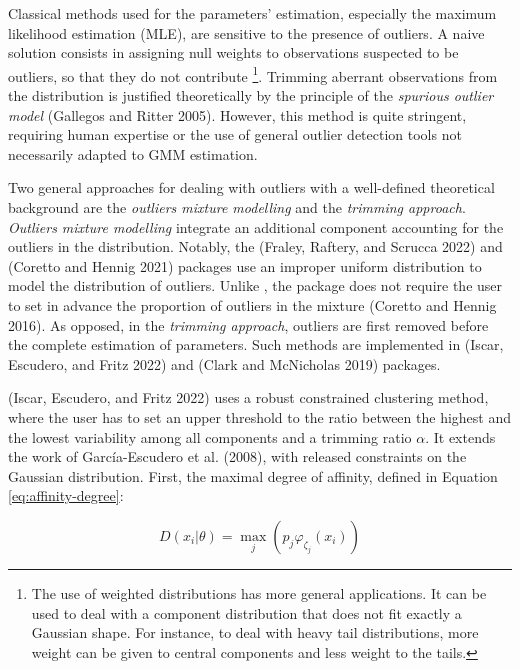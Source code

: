 Classical methods used for the parameters' estimation, especially the
maximum likelihood estimation (MLE), are sensitive to the presence of
outliers. A naive solution consists in assigning null weights to
observations suspected to be outliers, so that they do not contribute
\footnote{The use of weighted distributions has more general applications.
  It can be used to deal with a component distribution that does not
  fit exactly a Gaussian shape. For instance, to deal with heavy tail
  distributions, more weight can be given to central components and
  less weight to the tails.}. Trimming aberrant observations from the distribution is justified
theoretically by the principle of the \emph{spurious outlier model}
(Gallegos and Ritter 2005). However, this method is quite stringent,
requiring human expertise or the use of general outlier detection tools
not necessarily adapted to GMM estimation.

Two general approaches for dealing with outliers with a well-defined
theoretical background are the \emph{outliers mixture modelling} and the
\emph{trimming approach}. \emph{Outliers mixture modelling} integrate an
additional component accounting for the outliers in the distribution.
Notably, the  (Fraley, Raftery, and Scrucca 2022) and  (Coretto and Hennig 2021)
packages use an improper uniform distribution to model the distribution
of outliers. Unlike , the  package does not
require the user to set in advance the proportion of outliers in the
mixture (Coretto and Hennig 2016). As opposed, in the \emph{trimming approach},
outliers are first removed before the complete estimation of parameters.
Such methods are implemented in  (Iscar, Escudero, and Fritz 2022) and
 (Clark and McNicholas 2019) packages.

 (Iscar, Escudero, and Fritz 2022) uses a robust constrained clustering
method, where the user has to set an upper threshold to the ratio
between the highest and the lowest variability among all components and
a trimming ratio \(\alpha\). It extends the work of
García-Escudero et al. (2008), with released constraints on the Gaussian
distribution. First, the maximal degree of affinity, defined in Equation
\eqref{eq:affinity-degree}:

\begin{equation}
    D(x_i|\theta)=\max_j \left(p_{j} \varphi_{\zeta_j} (x_i) \right)
\label{eq:affinity-degree}
\end{equation}

